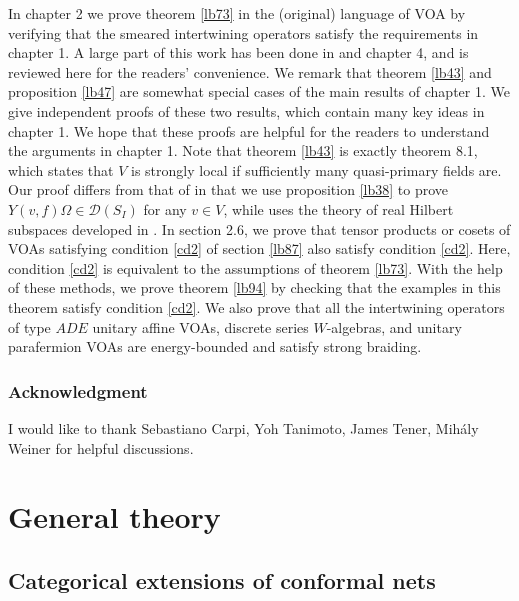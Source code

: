 \documentclass[11pt,b5paper,notitlepage]{article}
\theoremstyle{definition}
\theoremstyle{plain}
\newcommand{\Dom}{\scr D}
\newcommand{\scr}{\mathscr}
\numberwithin{equation}{subsection}
\begin{document}
In chapter 2 we prove theorem \ref{lb73} in the (original) language of VOA by verifying that the smeared intertwining operators satisfy the requirements  in chapter 1. A large part of this work has been done in \cite{Gui19a} and \cite{Gui21a} chapter 4, and is reviewed here for the readers' convenience. We remark that theorem \ref{lb43} and proposition \ref{lb47} are somewhat special cases of the main results of chapter 1. We give independent proofs of these two results, which contain many key ideas in  chapter 1. We hope that these  proofs are helpful for the readers to understand the arguments in chapter 1. Note that theorem \ref{lb43} is exactly \cite{CKLW18} theorem 8.1, which states that $V$ is strongly local if sufficiently many quasi-primary fields are. Our proof  differs from that of \cite{CKLW18} in that we use proposition \ref{lb38} to prove $Y(v,f)\Omega\in\Dom(S_I)$ for any $v\in V$, while \cite{CKLW18} uses the theory of real Hilbert subspaces developed in \cite{Lon08}. In section 2.6, we prove that tensor products or cosets of VOAs satisfying condition \ref{cd2} of section \ref{lb87} also satisfy condition \ref{cd2}. Here, condition \ref{cd2} is equivalent to the assumptions of theorem \ref{lb73}. With the help of these methods, we prove theorem \ref{lb94} by checking that the examples in this theorem satisfy condition \ref{cd2}. We also prove that all the intertwining operators of type $ADE$ unitary affine VOAs, discrete series $W$-algebras, and unitary parafermion VOAs are energy-bounded and satisfy strong braiding.





\subsubsection*{Acknowledgment}

I would like to thank Sebastiano Carpi, Yoh Tanimoto, James Tener, Mih\'aly Weiner for helpful discussions.






\section{General theory}

\subsection{Categorical extensions of conformal nets}\label{lb29}
\end{document}
